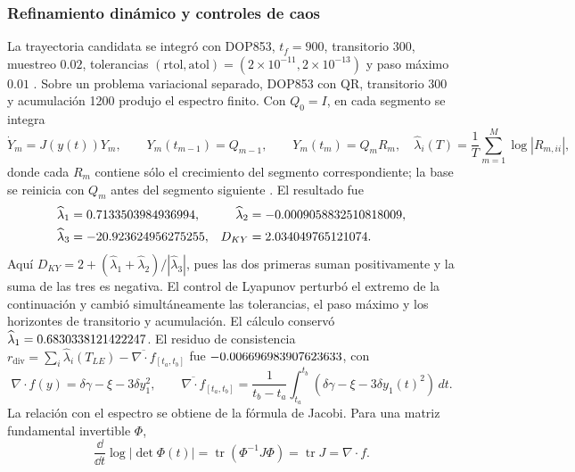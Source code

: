 \subsubsection*{Refinamiento dinámico y controles de caos}

La trayectoria candidata se integró con DOP853, $t_f=900$, transitorio 300,
muestreo $0.02$, tolerancias $(\mathrm{rtol},\mathrm{atol})=(2\times10^{-11},
2\times10^{-13})$ y paso máximo $0.01$ \cite{scipy2020}. Sobre un problema
variacional separado, DOP853 con QR, transitorio 300 y acumulación 1200 produjo
el espectro finito. Con $Q_0=I$, en cada segmento se integra
\begin{equation}
 \dot Y_m=J(y(t))Y_m,\qquad Y_m(t_{m-1})=Q_{m-1},
 \qquad Y_m(t_m)=Q_mR_m,
 \quad
 \widehat\lambda_i(T)=\frac{1}{T}\sum_{m=1}^{M}
 \log\left|R_{m,ii}\right|,
 \label{int:eq:mavpd-variational-qr}
\end{equation}
donde cada $R_m$ contiene sólo el crecimiento del segmento correspondiente;
la base se reinicia con $Q_m$ antes del segmento siguiente
\cite{Benettin1980a}. El resultado fue
\begin{equation}
 \begin{aligned}
  \widehat\lambda_1&=0.7133503984936994,
  &\widehat\lambda_2&=-0.0009058832510818009,\\
  \widehat\lambda_3&=-20.923624956275255,
  &D_{KY}&=2.034049765121074.
 \end{aligned}
 \label{int:eq:mavpd-chaos-lyapunov}
\end{equation}
Aquí \(D_{KY}=2+(\widehat\lambda_1+\widehat\lambda_2)/
|\widehat\lambda_3|\), pues las dos primeras suman positivamente y la suma de
las tres es negativa.
El control de Lyapunov perturbó el extremo de la continuación y cambió simultáneamente las
tolerancias, el paso máximo y los horizontes de transitorio y acumulación. El cálculo conservó $\widehat\lambda_1=0.6830338121422247$. El residuo de
consistencia
$r_{\mathrm{div}}=\sum_i\widehat\lambda_i(T_{LE})-
\overline{\nabla\!\cdot f}_{[t_a,t_b]}$ fue
$-0.006696983907623633$, con
\begin{equation}
 \nabla\!\cdot f(y)=\delta\gamma-\xi-3\delta y_1^2,
 \qquad
 \overline{\nabla\!\cdot f}_{[t_a,t_b]}=\frac{1}{t_b-t_a}
 \int_{t_a}^{t_b}\!\left(\delta\gamma-\xi-3\delta y_1(t)^2\right)\,dt.
 \label{int:eq:mavpd-divergence-control}
\end{equation}
La relación con el espectro se obtiene de la fórmula de Jacobi. Para una
matriz fundamental invertible \(\Phi\),
\[
 \frac{\dd}{\dd t}\log|\det\Phi(t)|
 =\operatorname{tr}(\Phi^{-1}J\Phi)=\operatorname{tr}J
 =\nabla\!\cdot f.
\]

